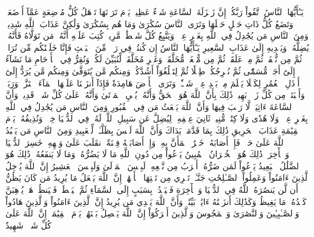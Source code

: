 يَـٰٓأَيُّهَا ٱلنَّاسُ ٱتَّقُواْ رَبَّكُمۡۚ إِنَّ زَلۡزَلَةَ ٱلسَّاعَةِ شَيۡءٌ عَظِيمٞ
يَوۡمَ تَرَوۡنَهَا تَذۡهَلُ كُلُّ مُرۡضِعَةٍ عَمَّآ أَرۡضَعَتۡ وَتَضَعُ كُلُّ ذَاتِ حَمۡلٍ حَمۡلَهَا وَتَرَى ٱلنَّاسَ سُكَٰرَىٰ وَمَا هُم بِسُكَٰرَىٰ وَلَٰكِنَّ عَذَابَ ٱللَّهِ شَدِيدٞ
وَمِنَ ٱلنَّاسِ مَن يُجَٰدِلُ فِي ٱللَّهِ بِغَيۡرِ عِلۡمٖ وَيَتَّبِعُ كُلَّ شَيۡطَٰنٖ مَّرِيدٖ
كُتِبَ عَلَيۡهِ أَنَّهُۥ مَن تَوَلَّاهُ فَأَنَّهُۥ يُضِلُّهُۥ وَيَهۡدِيهِ إِلَىٰ عَذَابِ ٱلسَّعِيرِ
يَـٰٓأَيُّهَا ٱلنَّاسُ إِن كُنتُمۡ فِي رَيۡبٖ مِّنَ ٱلۡبَعۡثِ فَإِنَّا خَلَقۡنَٰكُم مِّن تُرَابٖ ثُمَّ مِن نُّطۡفَةٖ ثُمَّ مِنۡ عَلَقَةٖ ثُمَّ مِن مُّضۡغَةٖ مُّخَلَّقَةٖ وَغَيۡرِ مُخَلَّقَةٖ لِّنُبَيِّنَ لَكُمۡۚ وَنُقِرُّ فِي ٱلۡأَرۡحَامِ مَا نَشَآءُ إِلَىٰٓ أَجَلٖ مُّسَمّٗى ثُمَّ نُخۡرِجُكُمۡ طِفۡلٗا ثُمَّ لِتَبۡلُغُوٓاْ أَشُدَّكُمۡۖ وَمِنكُم مَّن يُتَوَفَّىٰ وَمِنكُم مَّن يُرَدُّ إِلَىٰٓ أَرۡذَلِ ٱلۡعُمُرِ لِكَيۡلَا يَعۡلَمَ مِنۢ بَعۡدِ عِلۡمٖ شَيۡـٔٗاۚ وَتَرَى ٱلۡأَرۡضَ هَامِدَةٗ فَإِذَآ أَنزَلۡنَا عَلَيۡهَا ٱلۡمَآءَ ٱهۡتَزَّتۡ وَرَبَتۡ وَأَنۢبَتَتۡ مِن كُلِّ زَوۡجِۭ بَهِيجٖ
ذَٰلِكَ بِأَنَّ ٱللَّهَ هُوَ ٱلۡحَقُّ وَأَنَّهُۥ يُحۡيِ ٱلۡمَوۡتَىٰ وَأَنَّهُۥ عَلَىٰ كُلِّ شَيۡءٖ قَدِيرٞ
وَأَنَّ ٱلسَّاعَةَ ءَاتِيَةٞ لَّا رَيۡبَ فِيهَا وَأَنَّ ٱللَّهَ يَبۡعَثُ مَن فِي ٱلۡقُبُورِ
وَمِنَ ٱلنَّاسِ مَن يُجَٰدِلُ فِي ٱللَّهِ بِغَيۡرِ عِلۡمٖ وَلَا هُدٗى وَلَا كِتَٰبٖ مُّنِيرٖ
ثَانِيَ عِطۡفِهِۦ لِيُضِلَّ عَن سَبِيلِ ٱللَّهِۖ لَهُۥ فِي ٱلدُّنۡيَا خِزۡيٞۖ وَنُذِيقُهُۥ يَوۡمَ ٱلۡقِيَٰمَةِ عَذَابَ ٱلۡحَرِيقِ
ذَٰلِكَ بِمَا قَدَّمَتۡ يَدَاكَ وَأَنَّ ٱللَّهَ لَيۡسَ بِظَلَّـٰمٖ لِّلۡعَبِيدِ
وَمِنَ ٱلنَّاسِ مَن يَعۡبُدُ ٱللَّهَ عَلَىٰ حَرۡفٖۖ فَإِنۡ أَصَابَهُۥ خَيۡرٌ ٱطۡمَأَنَّ بِهِۦۖ وَإِنۡ أَصَابَتۡهُ فِتۡنَةٌ ٱنقَلَبَ عَلَىٰ وَجۡهِهِۦ خَسِرَ ٱلدُّنۡيَا وَٱلۡأٓخِرَةَۚ ذَٰلِكَ هُوَ ٱلۡخُسۡرَانُ ٱلۡمُبِينُ
يَدۡعُواْ مِن دُونِ ٱللَّهِ مَا لَا يَضُرُّهُۥ وَمَا لَا يَنفَعُهُۥۚ ذَٰلِكَ هُوَ ٱلضَّلَٰلُ ٱلۡبَعِيدُ
يَدۡعُواْ لَمَن ضَرُّهُۥٓ أَقۡرَبُ مِن نَّفۡعِهِۦۚ لَبِئۡسَ ٱلۡمَوۡلَىٰ وَلَبِئۡسَ ٱلۡعَشِيرُ
إِنَّ ٱللَّهَ يُدۡخِلُ ٱلَّذِينَ ءَامَنُواْ وَعَمِلُواْ ٱلصَّـٰلِحَٰتِ جَنَّـٰتٖ تَجۡرِي مِن تَحۡتِهَا ٱلۡأَنۡهَٰرُۚ إِنَّ ٱللَّهَ يَفۡعَلُ مَا يُرِيدُ
مَن كَانَ يَظُنُّ أَن لَّن يَنصُرَهُ ٱللَّهُ فِي ٱلدُّنۡيَا وَٱلۡأٓخِرَةِ فَلۡيَمۡدُدۡ بِسَبَبٍ إِلَى ٱلسَّمَآءِ ثُمَّ لۡيَقۡطَعۡ فَلۡيَنظُرۡ هَلۡ يُذۡهِبَنَّ كَيۡدُهُۥ مَا يَغِيظُ
وَكَذَٰلِكَ أَنزَلۡنَٰهُ ءَايَٰتِۭ بَيِّنَٰتٖ وَأَنَّ ٱللَّهَ يَهۡدِي مَن يُرِيدُ
إِنَّ ٱلَّذِينَ ءَامَنُواْ وَٱلَّذِينَ هَادُواْ وَٱلصَّـٰبِـِٔينَ وَٱلنَّصَٰرَىٰ وَٱلۡمَجُوسَ وَٱلَّذِينَ أَشۡرَكُوٓاْ إِنَّ ٱللَّهَ يَفۡصِلُ بَيۡنَهُمۡ يَوۡمَ ٱلۡقِيَٰمَةِۚ إِنَّ ٱللَّهَ عَلَىٰ كُلِّ شَيۡءٖ شَهِيدٌ
